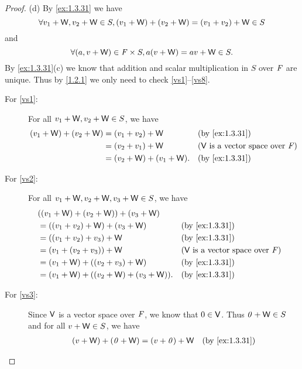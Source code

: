\begin{proof}{(d)}
  By \cref{ex:1.3.31} we have
  \[
    \forall v_1 + \mathsf{W}, v_2 + \mathsf{W} \in S, (v_1 + \mathsf{W}) + (v_2 + \mathsf{W}) = (v_1 + v_2) + \mathsf{W} \in S
  \]
  and
  \[
    \forall (a, v + \mathsf{W}) \in \mathit{F} \times S, a(v + \mathsf{W}) = av + \mathsf{W} \in S.
  \]
  By \cref{ex:1.3.31}(c) we know that addition and scalar multiplication in \(S\) over \(\mathit{F}\) are unique.
  Thus by \cref{1.2.1} we only need to check \ref{vs1}--\ref{vs8}.
  \begin{description}
    \item[For \ref{vs1}:]
      For all \(v_1 + \mathsf{W}, v_2 + \mathsf{W} \in S\), we have
      \begin{align*}
        (v_1 + \W) + (v_2 + \W) & = (v_1 + v_2) + \W         &  & \text{(by \cref{ex:1.3.31})}                  \\
                                & = (v_2 + v_1) + \W         &  & \text{(\(\V\) is a vector space over \(\F\))} \\
                                & = (v_2 + \W) + (v_1 + \W). &  & \text{(by \cref{ex:1.3.31})}
      \end{align*}
    \item[For \ref{vs2}:]
      For all \(v_1 + \mathsf{W}, v_2 + \mathsf{W}, v_3 + \mathsf{W} \in S\), we have
      \begin{align*}
         & ((v_1 + \W) + (v_2 + \W)) + (v_3 + \W)                                                       \\
         & = ((v_1 + v_2) + \W) + (v_3 + \W)         &  & \text{(by \cref{ex:1.3.31})}                  \\
         & = ((v_1 + v_2) + v_3) + \W                &  & \text{(by \cref{ex:1.3.31})}                  \\
         & = (v_1 + (v_2 + v_3)) + \W                &  & \text{(\(\V\) is a vector space over \(\F\))} \\
         & = (v_1 + \W) + ((v_2 + v_3) + \W)         &  & \text{(by \cref{ex:1.3.31})}                  \\
         & = (v_1 + \W) + ((v_2 + \W) + (v_3 + \W)). &  & \text{(by \cref{ex:1.3.31})}
      \end{align*}
    \item[For \ref{vs3}:]
      Since \(\mathsf{V}\) is a vector space over \(\mathit{F}\), we know that \(0 \in \mathsf{V}\).
      Thus \(\mathit{0} + \mathsf{W} \in S\) and for all \(v + \mathsf{W} \in S\), we have
      \begin{align*}
        (v + \W) + (\zv + \W) & = (v + \zv) + \W &  & \text{(by \cref{ex:1.3.31})}                  \\

\end{align*}
\end{description}
\end{proof}
